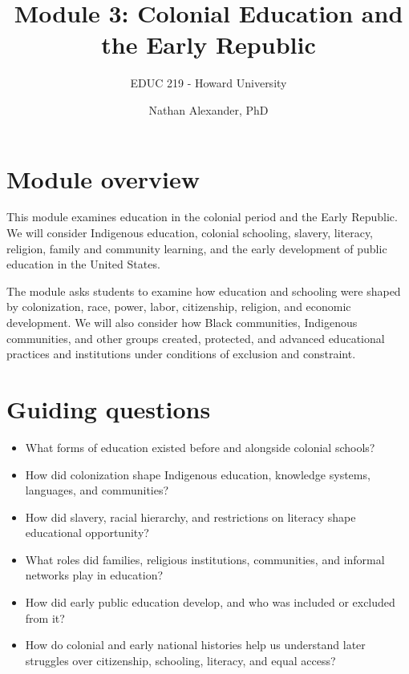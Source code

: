 \documentclass[
  letterpaper,
  DIV=11,
  numbers=noendperiod]{scrartcl}
\title{Module 3: Colonial Education and the Early Republic}
\subtitle{EDUC 219 - Howard University}
\author{Nathan Alexander, PhD}
\date{}
\providecommand{\tightlist}{%
  \setlength{\itemsep}{0pt}\setlength{\parskip}{0pt}}\usepackage{longtable,booktabs,array}
\renewcommand*\contentsname{Table of contents}
\newcommand\contentsname{Table of contents}
\begin{document}
\maketitle

\renewcommand*\contentsname{Table of contents}
{
\hypersetup{linkcolor=}
\setcounter{tocdepth}{3}
\tableofcontents
}

\section{Module overview}\label{module-overview}

This module examines education in the colonial period and the Early
Republic. We will consider Indigenous education, colonial schooling,
slavery, literacy, religion, family and community learning, and the
early development of public education in the United States.

The module asks students to examine how education and schooling were
shaped by colonization, race, power, labor, citizenship, religion, and
economic development. We will also consider how Black communities,
Indigenous communities, and other groups created, protected, and
advanced educational practices and institutions under conditions of
exclusion and constraint.

\section{Guiding questions}\label{guiding-questions}

\begin{itemize}
\tightlist
\item
  What forms of education existed before and alongside colonial schools?
\item
  How did colonization shape Indigenous education, knowledge systems,
  languages, and communities?
\item
  How did slavery, racial hierarchy, and restrictions on literacy shape
  educational opportunity?
\item
  What roles did families, religious institutions, communities, and
  informal networks play in education?
\item
  How did early public education develop, and who was included or
  excluded from it?
\item
  How do colonial and early national histories help us understand later
  struggles over citizenship, schooling, literacy, and equal access?
\end{itemize}
\end{document}
